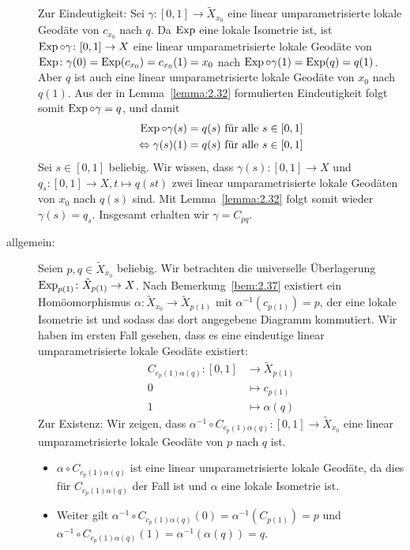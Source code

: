 \begin{beweis}
\begin{description}
		Zur Eindeutigkeit: Sei $\gamma\colon [0,1] \rightarrow \tilde{X}_{x_0}$ eine linear umparametrisierte lokale Geodäte von $c_{x_0}$ nach $q$.
		Da $\operatorname{Exp}$ eine lokale Isometrie ist, ist $\operatorname{Exp} \circ \gamma \colon [0,1] \rightarrow X$ eine linear umparametrisierte lokale Geodäte von $\operatorname{Exp} \colon \gamma(0) = \operatorname{Exp}(c_{x_0}) = c_{x_0}(1) = x_0$ nach $\operatorname{Exp} \circ \gamma(1) = \operatorname{Exp}(q) = q(1)$.
		Aber $q$ ist auch eine linear umparametrisierte lokale Geodäte von $x_0$ nach $q(1)$.
		Aus der in Lemma~\ref{lemma:2.32} formulierten Eindeutigkeit folgt somit $\operatorname{Exp} \circ \gamma = q$, und damit
		\begin{align*}
			\operatorname{Exp} \circ \gamma(s) &= q(s) \text{ für alle } s \in [0,1] \\
			\Leftrightarrow \gamma(s)(1) &= q(s) \text{ für alle } s \in [0,1]
		\end{align*}
		Sei $s \in [0,1]$ beliebig.
		Wir wissen, dass $\gamma(s) \colon [0,1] \rightarrow X$ und $ q_s\colon [0,1] \rightarrow X, t \mapsto q(st)$ zwei linear umparametrisierte lokale Geodäten von $x_0$ nach $q(s)$ sind.
		Mit Lemma~\ref{lemma:2.32} folgt somit wieder $\gamma(s) = q_s$.
		Insgesamt erhalten wir $\gamma = C_{pq}$.
		\item[allgemein:] Seien $p,q \in \tilde{X}_{x_0}$ beliebig.
		Wir betrachten die universelle Überlagerung $\operatorname{Exp}_{p(1)} \colon \tilde{X}_{p(1)} \rightarrow X$.
		Nach Bemerkung~\ref{bem:2.37} existiert ein Homöomorphismus $\alpha \colon \tilde{X}_{x_0} \rightarrow \tilde{X}_{p(1)}$ mit $\alpha^{-1}(c_{p(1)}) = p$, der eine lokale Isometrie ist und sodass das dort angegebene Diagramm kommutiert.
		Wir haben im ersten Fall gesehen, dass es eine eindeutige linear umparametrisierte lokale Geodäte existiert:
		\begin{align*}
			C_{c_p(1)\alpha(q)} \colon [0,1] &\longrightarrow \tilde{X}_{p(1)} \\
			0 &\longmapsto c_{p(1)} \\
			1 &\longmapsto \alpha(q)
		\end{align*}
		Zur Existenz:
		Wir zeigen, dass $\alpha^{-1} \circ C_{c_p(1)\alpha(q)}\colon [0,1] \rightarrow \tilde{X}_{x_0}$ eine linear umparametrisierte lokale Geodäte von $p$ nach $q$ ist.
		\begin{itemize}
			\item $\alpha \circ C_{c_p(1)\alpha(q)}$ ist eine linear umparametrisierte lokale Geodäte, da dies für $C_{c_p(1)\alpha(q)}$ der Fall ist und $\alpha$ eine lokale Isometrie ist.
			\item Weiter gilt $\alpha^{-1} \circ C_{c_p(1)\alpha(q)}(0) = \alpha^{-1}(C_{p(1)}) = p$ und $\alpha^{-1} \circ C_{c_p(1)\alpha(q)}(1) = \alpha^{-1}(\alpha(q)) = q$.
		\end{itemize}
		

\end{description}
\end{beweis}
